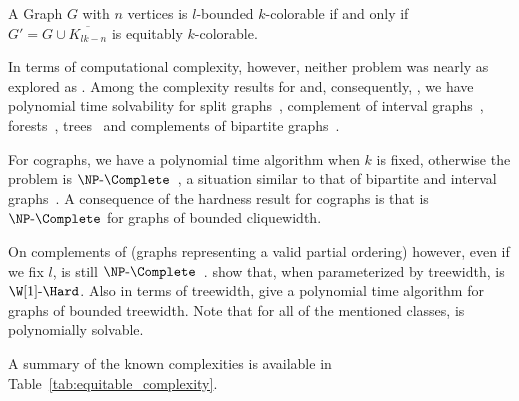 
\begin{observation*}
    A Graph $G$ with $n$ vertices is $l$-bounded $k$-colorable if and only if $G' = G \cup \overline{K_{lk - n}}$ is equitably $k$-colorable.
\end{observation*}


In terms of computational complexity, however, neither problem was nearly as explored as .
Among the complexity results for  and, consequently, , we have polynomial time solvability for split graphs~\citep{equitable_split}, complement of interval graphs~\citep{graph_partitioning1}, forests~\citep{mutual_exclusion_scheduling}, trees~\citep{equitable_trees} and complements of bipartite graphs~\citep{graph_partitioning1}.

For cographs, we have a polynomial time algorithm when $k$ is fixed, otherwise the problem is $\NPc$~\citep{graph_partitioning1}, a situation similar to that of bipartite and interval graphs~\citep{graph_partitioning1}.
A consequence of the hardness result for cographs is that  is $\NPc$ for graphs of bounded cliquewidth.

On complements of  (graphs representing a valid partial ordering) however, even if we fix $l$,  is still $\NPc$~\citep{chain_antichain}.
\cite{colorful_treewidth} show that, when parameterized by treewidth,  is $\W[1]\text{-}\Hard$.
Also in terms of treewidth, \cite{equitable_treewidth} give a polynomial time algorithm for graphs of bounded treewidth.
Note that for all of the mentioned classes,  is polynomially solvable.

A summary of the known complexities is available in Table~\ref{tab:equitable_complexity}.


